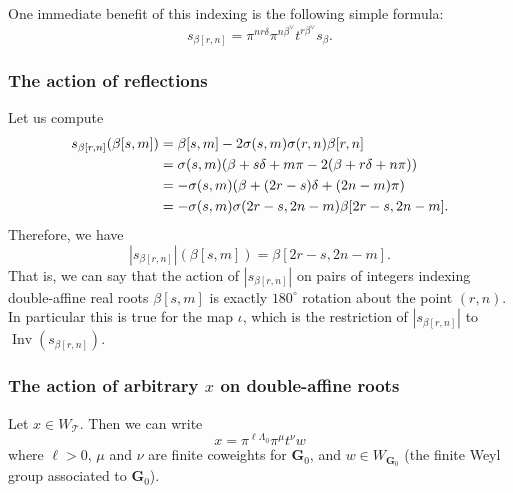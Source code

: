 \documentclass[ALCO,ThmDefs,Unicode]{cedram}
\DeclareMathOperator{\Inv}{Inv}
\newcommand{\betacheck}{\beta^\vee}
\newcommand{\bG}{\mathbf{G}}
\newcommand{\cT}{\mathcal{T}}
\newcommand{\WTits}{W_{\TitsCone}}
\newcommand{\TitsCone}{\cT}
\begin{document}
One immediate benefit of this indexing is the following simple formula:
\begin{equation}\label{double-affine-refl}
s_{\beta[r,n]} = \pi^{nr\delta} \pi^{n\betacheck} t^{r\betacheck} s_\beta.
\end{equation}

\subsubsection{The action of reflections}

Let us compute
\begin{align}\label{eq:reflection-formula}
s_{\beta[r,n]}(\beta[s,m]) &= \beta[s,m] - 2 \sigma(s,m) \sigma(r,n) \beta[r,n]\\
&= \sigma(s,m) (\beta + s \delta + m \pi - 2(\beta + r \delta + n \pi))\notag\\
&= -\sigma(s,m) (\beta + (2r-s)\delta + (2n-m)\pi)\notag\\
&= -\sigma(s,m) \sigma(2r-s,2n-m) \beta[2r-s,2n-m]\notag.
\end{align}
Therefore, we have
\begin{equation}
|s_{\beta[r,n]}| (\beta[s,m]) = \beta[2r-s,2n-m].
\end{equation}
That is, we can say that the action of $|s_{\beta[r,n]}|$ on pairs of integers indexing double-affine real roots $\beta[s,m]$ is exactly $180^\circ$ rotation about the point $(r,n)$. In particular this is true for the map $\iota$, which is the restriction of $|s_{\beta[r,n]}|$ to $\Inv(s_{\beta[r,n]})$.

\subsubsection{The action of arbitrary \texorpdfstring{$x$}{x} on double-affine roots}

Let $x \in \WTits$. Then we can write
\begin{equation}\label{eq:2}
x = \pi^{\ell \Lambda_0} \pi^{\mu} t^{\nu} w
\end{equation}
where $\ell > 0$, $\mu$ and $\nu$ are finite coweights for $\bG_0$, and $w \in W_{\bG_0}$ (the finite Weyl group associated to $\bG_0$).
\end{document}
